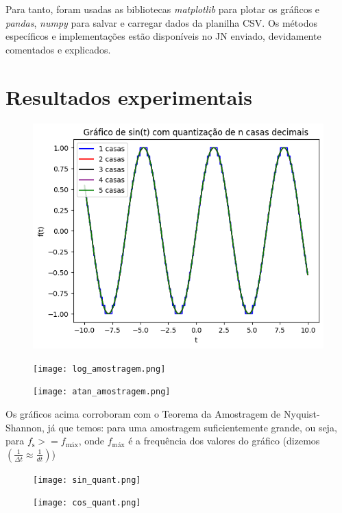 \documentclass[12pt]{article}
\begin{document}
Para tanto, foram usadas as bibliotecas \textit{matplotlib} para plotar os gráficos e \textit{pandas}, \textit{numpy} para salvar e carregar dados da planilha CSV. Os métodos específicos e implementações estão disponíveis no JN enviado, devidamente comentados e explicados.

\section{Resultados experimentais}

\begin{figure}[h]
    \centering
    \includegraphics[width=0.5\linewidth]{sin_amostragem.png}
    \label{fig:enter-label}
\end{figure}

\begin{figure}[h]
    \centering
    \texttt{[image: log\_amostragem.png]}
    \label{fig:enter-label}
\end{figure}

\clearpage

\begin{figure}[h]
    \centering
    \texttt{[image: atan\_amostragem.png]}
    \label{fig:enter-label}
\end{figure}

Os gráficos acima corroboram com o Teorema da Amostragem de Nyquist-Shannon, já que temos: para uma amostragem suficientemente grande, ou seja, para $f_\text{s} >= f_\text{máx}$, onde $f_\text{máx}$ é a frequência dos valores do gráfico (dizemos $(\frac{1}{\Delta t} \approx \frac{1}{dt})$)

\begin{figure}[h]
    \centering
    \texttt{[image: sin\_quant.png]}
    \label{fig:enter-label}
\end{figure}

\clearpage

\begin{figure}[h]
    \centering
    \texttt{[image: cos\_quant.png]}
    \label{fig:enter-label}
\end{figure}
\end{document}

